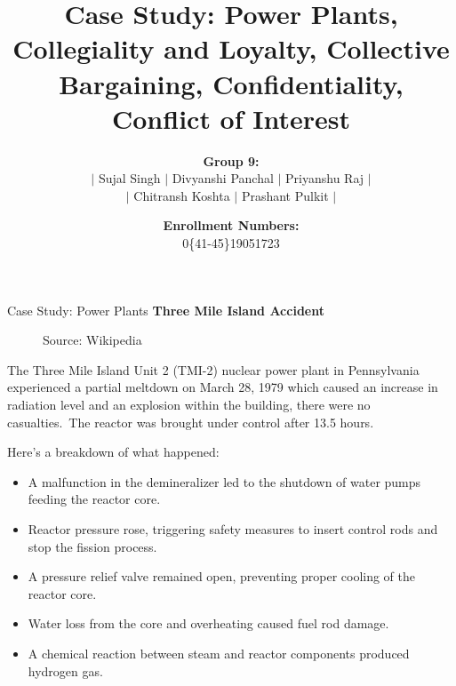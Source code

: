 \documentclass[11pt]{beamer}
\title[Power Plants, Collegiality and Loyalty, \ldots]{%
    \large Case Study: Power Plants, Collegiality and Loyalty, Collective Bargaining, Confidentiality,
    Conflict of Interest
}
\author[Sujal, Divyanshi, Priyanshu \ldots]{%
    \textbf{Group 9:}\\%
    \(|\) Sujal Singh \(|\) Divyanshi Panchal \(|\) Priyanshu Raj \(|\)\\\(|\) Chitransh Koshta \(|\) Prashant
    Pulkit \(|\)%
    \vspace*{-15pt}
}
\date[Chitransh, Prashant]{\textbf{Enrollment Numbers:}\\0\{41-45\}19051723}
\begin{document}
    \maketitle

    \begin{frame}[t,allowframebreaks]{Case Study: Power Plants}
        \textbf{Three Mile Island Accident}\\[10pt]
        \begin{minipage}[t]{0.45\textwidth}
            \vspace*{-8pt}
            \begin{figure}
                \label{fig:three-mile-island}
                {\tiny Source: Wikipedia}
            \end{figure}
        \end{minipage}
        \begin{minipage}[t]{0.54\textwidth}%
            The Three Mile Island Unit 2 (TMI-2) nuclear power plant in Pennsylvania experienced a partial meltdown on
            March 28, 1979 which caused an \alert{increase in radiation level and an explosion within the building},
            there were no casualties.\ The reactor was brought under control after 13.5 hours.
        \end{minipage}

        \framebreak
        Here's a breakdown of what happened:\\[10pt]
        \begin{itemize}
            \small
            \item A malfunction in the demineralizer led to the shutdown of water pumps feeding the reactor core.
            \item Reactor pressure rose, triggering safety measures to insert control rods and stop the fission process.
            \item A pressure relief valve remained open, preventing proper cooling of the reactor core.
            \item Water loss from the core and overheating caused fuel rod damage.
            \item A chemical reaction between steam and reactor components produced hydrogen gas.
        \end{itemize}


\end{frame}
\end{document}
